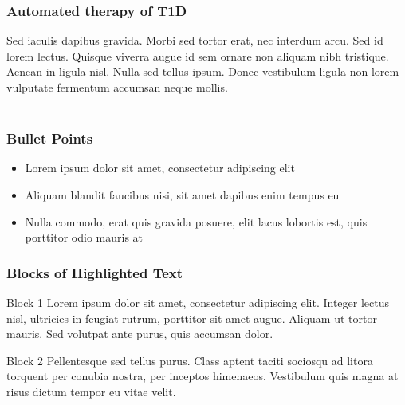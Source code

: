 
\begin{frame}
\frametitle{Automated therapy of T1D}
Sed iaculis dapibus gravida. Morbi sed tortor erat, nec interdum arcu. Sed id lorem lectus. Quisque viverra augue id sem ornare non aliquam nibh tristique. Aenean in ligula nisl. Nulla sed tellus ipsum. Donec vestibulum ligula non lorem vulputate fermentum accumsan neque mollis.\\~\\
\end{frame}


\begin{frame}
\frametitle{Bullet Points}
\begin{itemize}
\item Lorem ipsum dolor sit amet, consectetur adipiscing elit
\item Aliquam blandit faucibus nisi, sit amet dapibus enim tempus eu
\item Nulla commodo, erat quis gravida posuere, elit lacus lobortis est, quis porttitor odio mauris at
\end{itemize}
\end{frame}


\begin{frame}
\frametitle{Blocks of Highlighted Text}
\begin{block}{Block 1}
Lorem ipsum dolor sit amet, consectetur adipiscing elit. Integer lectus nisl, ultricies in feugiat rutrum, porttitor sit amet augue. Aliquam ut tortor mauris. Sed volutpat ante purus, quis accumsan dolor.
\end{block}

\begin{block}{Block 2}
Pellentesque sed tellus purus. Class aptent taciti sociosqu ad litora torquent per conubia nostra, per inceptos himenaeos. Vestibulum quis magna at risus dictum tempor eu vitae velit.
\end{block}

\end{frame}

